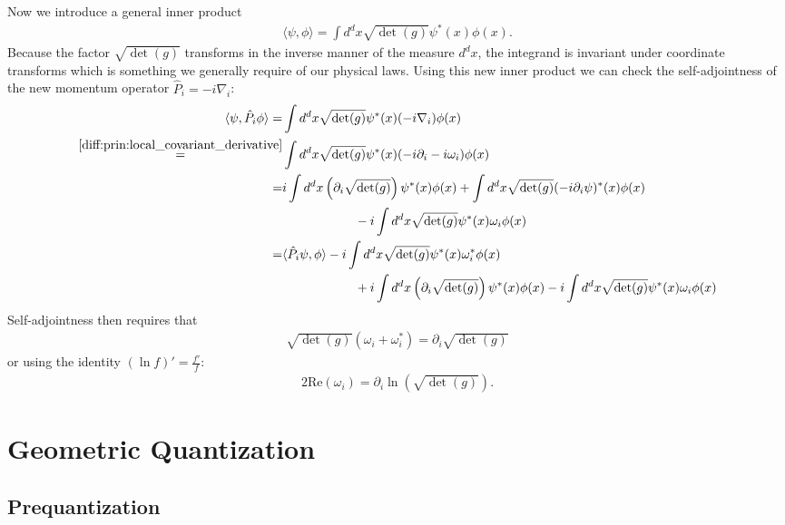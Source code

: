 \begin{construct}
		Now we introduce a general inner product
		\begin{gather}
			\langle\psi, \phi\rangle = \int d^dx\sqrt{\det(g)}\psi^*(x)\phi(x).
		\end{gather}
		Because the factor $\sqrt{\det(g)}$ transforms in the inverse manner of the measure $d^dx$, the integrand is invariant under coordinate transforms which is something we generally require of our physical laws. Using this new inner product we can check the self-adjointness of the new momentum operator $\hat{P}_i = -i\nabla_i$:
		\begin{align*}
			\langle\psi, \hat{P}_i\phi\rangle = &\int d^dx\sqrt{\det(g)}\psi^*(x)(-i\nabla_i)\phi(x)\\
			\overset{\ref{diff:prin:local_covariant_derivative}}{=} &\int d^dx\sqrt{\det(g)}\psi^*(x)(-i\partial_i - i\omega_i)\phi(x)\\
			= &i\int d^dx\left(\partial_i\sqrt{\det(g)}\right)\psi^*(x)\phi(x) + \int d^dx\sqrt{\det(g)}(-i\partial_i\psi)^*(x)\phi(x)\\
				&\hspace{2cm} -i \int d^dx\sqrt{\det(g)}\psi^*(x)\omega_i\phi(x)\\
			= &\langle\hat{P}_i\psi, \phi\rangle -i \int d^dx\sqrt{\det(g)}\psi^*(x)\omega_i^*\phi(x)\\
				&\hspace{2cm} + i\int d^dx\left(\partial_i\sqrt{\det(g)}\right)\psi^*(x)\phi(x) -i \int d^dx\sqrt{\det(g)}\psi^*(x)\omega_i\phi(x)
		\end{align*}
		Self-adjointness then requires that
		\begin{gather}
			\sqrt{\det(g)}(\omega_i + \omega_i^*) = \partial_i\sqrt{\det(g)}
		\end{gather}
		or using the identity $(\ln f)' = \frac{f'}{f}$:
		\begin{gather}
			2\text{Re}(\omega_i) = \partial_i\ln\left(\sqrt{\det(g)}\right).
		\end{gather}
	\end{construct}
	
\section{Geometric Quantization}\label{section:geometric_quantization}
\subsection{Prequantization}

